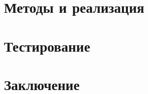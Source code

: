 \documentclass{spbau-diploma}
\begin{document}
\section{Методы и реализация}


\clearpage
\section{Тестирование}


\section*{Заключение}



%

\end{document}
